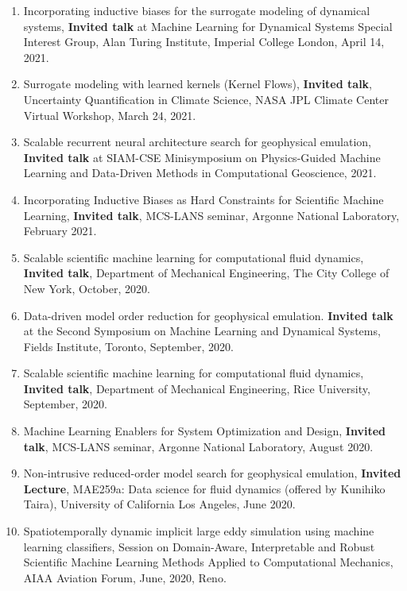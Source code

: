 \documentclass[letterpaper]{article}
\begin{document}
\begin{enumerate}
\item Incorporating inductive biases for the surrogate modeling of dynamical systems, \textbf{Invited talk} at Machine Learning for Dynamical Systems Special Interest Group, Alan Turing Institute, Imperial College London, April 14, 2021.

\item Surrogate modeling with learned kernels (Kernel Flows), \textbf{Invited talk}, Uncertainty Quantification in Climate Science, NASA JPL Climate Center Virtual Workshop, March 24, 2021.

\item Scalable recurrent neural architecture search for geophysical emulation, \textbf{Invited talk} at SIAM-CSE Minisymposium on Physics-Guided Machine Learning and Data-Driven Methods in Computational Geoscience, 2021.

\item Incorporating Inductive Biases as Hard Constraints for Scientific Machine Learning, \textbf{Invited talk}, MCS-LANS seminar, Argonne National Laboratory, February 2021.

\item Scalable scientific machine learning for computational fluid dynamics, \textbf{Invited talk}, Department of Mechanical Engineering, The City College of New York, October, 2020.

\item Data-driven model order reduction for geophysical emulation. \textbf{Invited talk} at the Second Symposium on Machine Learning and Dynamical Systems, Fields Institute, Toronto, September, 2020.

\item Scalable scientific machine learning for computational fluid dynamics, \textbf{Invited talk}, Department of Mechanical Engineering, Rice University, September, 2020.

\item Machine Learning Enablers for System Optimization and Design, \textbf{Invited talk}, MCS-LANS seminar, Argonne National Laboratory, August 2020.

\item Non-intrusive reduced-order model search for geophysical emulation, \textbf{Invited Lecture}, MAE259a: Data science for fluid dynamics (offered by Kunihiko Taira), University of California Los Angeles, June 2020.

\item Spatiotemporally dynamic implicit large eddy simulation using machine learning classifiers, Session on Domain-Aware, Interpretable and Robust Scientific Machine Learning Methods Applied to Computational Mechanics, AIAA Aviation Forum, June, 2020, Reno. 


\end{enumerate}
\end{document}
